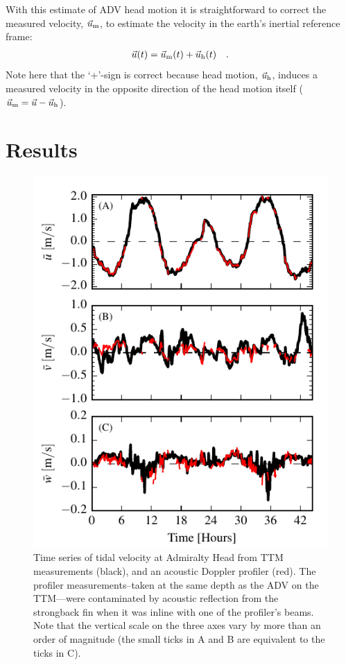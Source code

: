 \documentclass[twocol]{ametsoc}
\begin{document}
With this estimate of ADV head motion it is straightforward to correct the measured velocity, $\vec{u}_\mathrm{m}$, to estimate the velocity in the earth's inertial reference frame:
\begin{align}
  \label{eqn:u_mot_def}
  \vec{u}(t) & = \vec{u}_\mathrm{m}(t) + \vec{u}_\mathrm{h}(t) &  .
\end{align}
Note here that the `+'-sign is correct because head motion, $\vec{u}_\mathrm{h}$, induces a measured velocity in the opposite direction of the head motion itself ($\vec{u}_\mathrm{m} = \vec{u} - \vec{u}_\mathrm{h}$).

\section{Results}

\begin{figure}[t]
  \centering
  \includegraphics{TimeFig02}
  \caption{Time series of tidal velocity at Admiralty Head from TTM measurements (black), and an acoustic Doppler profiler (red). The profiler measurements--taken at the same depth as the ADV on the TTM---were contaminated by acoustic reflection from the strongback fin when it was inline with one of the profiler's beams. Note that the vertical scale on the three axes vary by more than an order of magnitude (the small ticks in A and B are equivalent to the ticks in C).}
  \label{fig:vel_time}
\end{figure}
\end{document}
